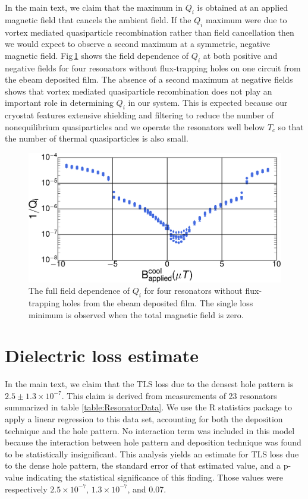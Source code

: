 In the main text, we claim that the maximum in $Q_i$ is obtained at an applied magnetic field that cancels the ambient field.  If the $Q_i$ maximum were due to vortex mediated quasiparticle recombination\cite{nsanzineza2014} rather than field cancellation then we would expect to observe a second maximum at a symmetric, negative magnetic field.   Fig\,\ref{fullfield} shows the field dependence of $Q_i$ at both positive and negative fields for four resonators without flux-trapping holes on one circuit from the ebeam deposited film.  The absence of a second maximum at negative fields shows that vortex mediated quasiparticle recombination does not play an important role in determining $Q_{i}$ in our system.  This is expected because our cryostat features extensive shielding and filtering to reduce the number of nonequilibrium quasiparticles and we operate the resonators well below $T_c$ so that the number of thermal quasiparticles is also small.

\begin{figure}
    \begin{center}
        \includegraphics[width=150mm]{DielectricFluxTrap_Supp_Rev2_fullfield.pdf}
        \caption{The full field dependence of $Q_i$ for four resonators without flux-trapping holes from the ebeam deposited film.  The single loss minimum is observed when the total magnetic field is zero.}
        \label{fullfield}
    \end{center}
\end{figure}

\section{Dielectric loss estimate}
In the main text, we claim that the TLS loss due to the densest hole pattern is $2.5 \pm 1.3\times 10^{-7}$.  This claim is derived from measurements of 23 resonators summarized in table \ref{table:ResonatorData}.  We use the R statistics package\cite{RStatistics} to apply a linear regression to this data set, accounting for both the deposition technique and the hole pattern.  No interaction term was included in this model because the interaction between hole pattern and deposition technique was found to be statistically insignificant.  This analysis yields an estimate for TLS loss due to the dense hole pattern, the standard error of that estimated value, and a p-value indicating the statistical significance of this finding.  Those values were respectively $2.5\times10^{-7}$, $1.3\times10^{-7}$, and 0.07.

